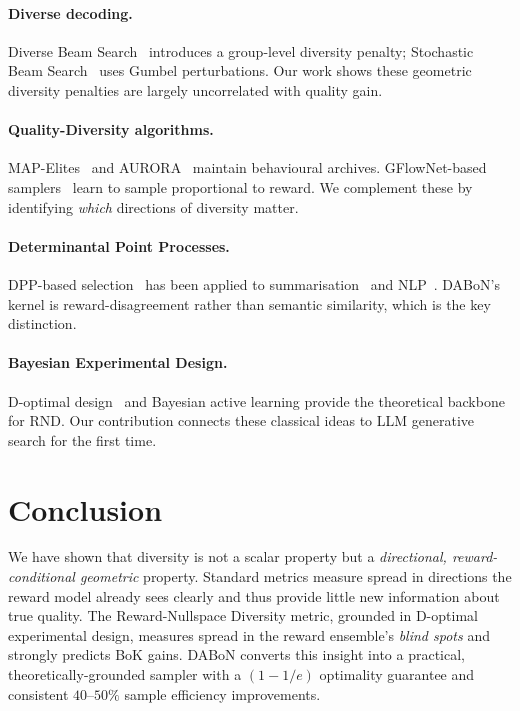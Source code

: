 \documentclass{article}
\begin{document}
\paragraph{Diverse decoding.}
Diverse Beam Search~\citep{vijayakumar2016diverse} introduces a group-level
diversity penalty; Stochastic Beam Search~\citep{kool2019stochastic} uses
Gumbel perturbations.  Our work shows these geometric diversity penalties
are largely uncorrelated with quality gain.

\paragraph{Quality-Diversity algorithms.}
MAP-Elites~\citep{mouret2015illuminating} and AURORA~\citep{grillotti2022unsupervised}
maintain behavioural archives.  GFlowNet-based samplers~\citep{bengio2021gflownet,
jain2022biological} learn to sample proportional to reward.  We complement
these by identifying \emph{which} directions of diversity matter.

\paragraph{Determinantal Point Processes.}
DPP-based selection~\citep{kulesza2012determinantal} has been applied to
summarisation~\citep{cho2019mixture} and NLP~\citep{perez2021true}.
DABoN's kernel is reward-disagreement rather than semantic similarity,
which is the key distinction.

\paragraph{Bayesian Experimental Design.}
D-optimal design~\citep{fedorov1972theory} and Bayesian active learning
\citep{settles2012active,houlsby2011bayesian} provide the theoretical backbone
for RND.  Our contribution connects these classical ideas to LLM generative
search for the first time.

\section{Conclusion}
\label{sec:conclusion}

We have shown that diversity is not a scalar property but a
\emph{directional, reward-conditional geometric} property.  Standard
metrics measure spread in directions the reward model already sees clearly
and thus provide little new information about true quality.  The
Reward-Nullspace Diversity metric, grounded in D-optimal experimental
design, measures spread in the reward ensemble's \emph{blind spots} and
strongly predicts BoK gains.  DABoN converts this insight into a practical,
theoretically-grounded sampler with a $(1-1/e)$ optimality guarantee and
consistent $40$--$50\%$ sample efficiency improvements.
\end{document}
